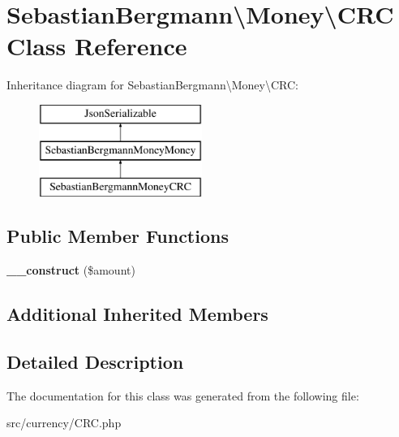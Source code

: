 \hypertarget{classSebastianBergmann_1_1Money_1_1CRC}{}\section{Sebastian\+Bergmann\textbackslash{}Money\textbackslash{}C\+R\+C Class Reference}
\label{classSebastianBergmann_1_1Money_1_1CRC}
Inheritance diagram for Sebastian\+Bergmann\textbackslash{}Money\textbackslash{}C\+R\+C\+:\begin{figure}[H]
\begin{center}
\leavevmode
\includegraphics[height=3.000000cm]{classSebastianBergmann_1_1Money_1_1CRC}
\end{center}
\end{figure}
\subsection*{Public Member Functions}
\begin{DoxyCompactItemize}
\item 
\hypertarget{classSebastianBergmann_1_1Money_1_1CRC_a14e500d2a9f870d8d1a525a273c5863f}{}{\bfseries \+\_\+\+\_\+construct} (\$amount)\label{classSebastianBergmann_1_1Money_1_1CRC_a14e500d2a9f870d8d1a525a273c5863f}

\end{DoxyCompactItemize}
\subsection*{Additional Inherited Members}


\subsection{Detailed Description}


The documentation for this class was generated from the following file\+:\begin{DoxyCompactItemize}
\item 
src/currency/C\+R\+C.\+php\end{DoxyCompactItemize}
